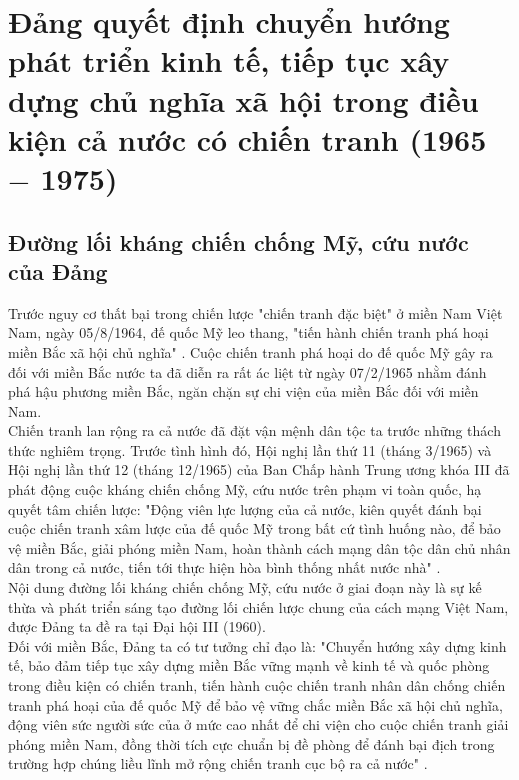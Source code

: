 \section{Đảng quyết định chuyển hướng phát triển kinh tế, tiếp tục xây dựng chủ nghĩa xã hội trong điều kiện cả nước có chiến tranh (1965 $-$ 1975)}
\subsection{Đường lối kháng chiến chống Mỹ, cứu nước của Đảng}
Trước nguy cơ thất bại trong chiến lược "chiến tranh đặc biệt" ở miền Nam Việt Nam, ngày 05/8/1964, đế quốc Mỹ leo thang, "tiến hành chiến tranh phá hoại miền Bắc xã hội chủ nghĩa" \supercite{hvct}. Cuộc chiến tranh phá hoại do đế quốc Mỹ gây ra đối với miền Bắc nước ta đã diễn ra rất ác liệt từ ngày 07/2/1965 nhằm đánh phá hậu phương miền Bắc, ngăn chặn sự chi viện của miền Bắc đối với miền Nam.\\
Chiến tranh lan rộng ra cả nước đã đặt vận mệnh dân tộc ta trước những thách thức nghiêm trọng. Trước tình hình đó, Hội nghị lần thứ 11 (tháng 3/1965) và Hội nghị lần thứ 12 (tháng 12/1965) của Ban Chấp hành Trung ương khóa III đã phát động cuộc kháng chiến chống Mỹ, cứu nước trên phạm vi toàn quốc, hạ quyết tâm chiến lược: "Động viên lực lượng của cả nước, kiên quyết đánh bại cuộc chiến tranh xâm lược của đế quốc Mỹ trong bất cứ tình huống nào, để bảo vệ miền Bắc, giải phóng miền Nam, hoàn thành cách mạng dân tộc dân chủ nhân dân trong cả nước, tiến tới thực hiện hòa bình thống nhất nước nhà" \supercite{vkd26}.\\
Nội dung đường lối kháng chiến chống Mỹ, cứu nước ở giai đoạn này là sự kế thừa và phát triển sáng tạo đường lối chiến lược chung của cách mạng Việt Nam, được Đảng ta đề ra tại Đại hội III (1960).\\
Đối với miền Bắc, Đảng ta có tư tưởng chỉ đạo là: "Chuyển hướng xây dựng kinh tế, bảo đảm tiếp tục xây dựng miền Bắc vững mạnh về kinh tế và quốc phòng trong điều kiện có chiến tranh, tiến hành cuộc chiến tranh nhân dân chống chiến tranh phá hoại của đế quốc Mỹ để bảo vệ vững chắc miền Bắc xã hội chủ nghĩa, động viên sức người sức của ở mức cao nhất để chi viện cho cuộc chiến tranh giải phóng miền Nam, đồng thời tích cực chuẩn bị đề phòng để đánh bại địch trong trường hợp chúng liều lĩnh mở rộng chiến tranh cục bộ ra cả nước" \supercite{giaotrinh}.

